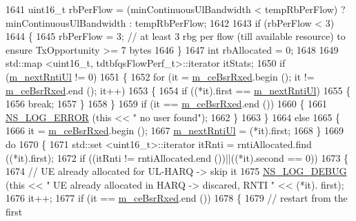 \begin{DoxyCode}
1641   uint16\_t rbPerFlow = (minContinuousUlBandwidth < tempRbPerFlow) ? minContinuousUlBandwidth : 
      tempRbPerFlow;
1642 
1643   \textcolor{keywordflow}{if} (rbPerFlow < 3)
1644     \{
1645       rbPerFlow = 3;  \textcolor{comment}{// at least 3 rbg per flow (till available resource) to ensure TxOpportunity >= 7
       bytes}
1646     \}
1647   \textcolor{keywordtype}{int} rbAllocated = 0;
1648 
1649   std::map <uint16\_t, tdtbfqsFlowPerf\_t>::iterator itStats;
1650   \textcolor{keywordflow}{if} (\hyperlink{classns3_1_1TdTbfqFfMacScheduler_a01649b4140890dd7adb19d752be0a6ff}{m\_nextRntiUl} != 0)
1651     \{
1652       \textcolor{keywordflow}{for} (it = \hyperlink{classns3_1_1TdTbfqFfMacScheduler_ab399ba0c15f9cd1688fb044cf915deb7}{m\_ceBsrRxed}.begin (); it != \hyperlink{classns3_1_1TdTbfqFfMacScheduler_ab399ba0c15f9cd1688fb044cf915deb7}{m\_ceBsrRxed}.end (); it++)
1653         \{
1654           \textcolor{keywordflow}{if} ((*it).first == \hyperlink{classns3_1_1TdTbfqFfMacScheduler_a01649b4140890dd7adb19d752be0a6ff}{m\_nextRntiUl})
1655             \{
1656               \textcolor{keywordflow}{break};
1657             \}
1658         \}
1659       \textcolor{keywordflow}{if} (it == \hyperlink{classns3_1_1TdTbfqFfMacScheduler_ab399ba0c15f9cd1688fb044cf915deb7}{m\_ceBsrRxed}.end ())
1660         \{
1661           \hyperlink{group__logging_ga0261a8db1d4ac5f79417d117634fd455}{NS\_LOG\_ERROR} (\textcolor{keyword}{this} << \textcolor{stringliteral}{" no user found"});
1662         \}
1663     \}
1664   \textcolor{keywordflow}{else}
1665     \{
1666       it = \hyperlink{classns3_1_1TdTbfqFfMacScheduler_ab399ba0c15f9cd1688fb044cf915deb7}{m\_ceBsrRxed}.begin ();
1667       \hyperlink{classns3_1_1TdTbfqFfMacScheduler_a01649b4140890dd7adb19d752be0a6ff}{m\_nextRntiUl} = (*it).first;
1668     \}
1669   \textcolor{keywordflow}{do}
1670     \{
1671       std::set <uint16\_t>::iterator itRnti = rntiAllocated.find ((*it).first);
1672       \textcolor{keywordflow}{if} ((itRnti != rntiAllocated.end ())||((*it).second == 0))
1673         \{
1674           \textcolor{comment}{// UE already allocated for UL-HARQ -> skip it}
1675           \hyperlink{group__logging_ga413f1886406d49f59a6a0a89b77b4d0a}{NS\_LOG\_DEBUG} (\textcolor{keyword}{this} << \textcolor{stringliteral}{" UE already allocated in HARQ -> discared, RNTI "} << (*it).
      first);
1676           it++;
1677           \textcolor{keywordflow}{if} (it == \hyperlink{classns3_1_1TdTbfqFfMacScheduler_ab399ba0c15f9cd1688fb044cf915deb7}{m\_ceBsrRxed}.end ())
1678             \{
1679               \textcolor{comment}{// restart from the first}

\end{DoxyCode}
